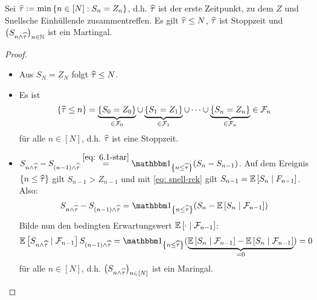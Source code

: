 \begin{lemma} \label{lemma: 5.4}
	Sei $\widehat{\tau} \mathrel{:=} \min\left\{ n \in [N] : S_n = Z_n \right\}$, d.h. $\widehat{\tau}$ ist der erste Zeitpunkt, zu dem $Z$ und Snellsche Einhüllende zusammentreffen. Es gilt $\widehat{\tau} \le N$, $\widehat{\tau}$ ist Stoppzeit und $\left( S_{n \land \widehat{\tau}} \right)_{n \in \mathbb{N}}$ ist ein Martingal.
\end{lemma}
\begin{proof}
	\begin{itemize}[nolistsep, leftmargin=*]
		\item Aus $S_N = Z_N$ folgt $\widehat{\tau} \le N$.
		\item Es ist
		\begin{equation*}
			\left\{ \widehat{\tau} \le n \right\} = \underbrace{\left\{ S_0 = Z_0 \right\}}_{\in \mathcal{F}_0} \cup \underbrace{\left\{ S_1 = Z_1 \right\}}_{\in \mathcal{F}_1} \cup \dots \cup \underbrace{\left\{ S_n = Z_n \right\}}_{\in \mathcal{F}_n} \in \mathcal{F}_n
		\end{equation*}
		für alle $n \in [N]$, d.h. $\widehat{\tau}$ ist eine Stoppzeit.
		\item $S_{n \land \dach{\tau}} - S_{(n-1) \land \dach{\tau}} \overset{\eqref{eq: 6.1-star}}{=} \one_{\menge{n \le \dach{\tau}}} (S_n - S_{n-1})$. Auf dem Ereignis $\left\{ n \le \widehat{\tau} \right\}$ gilt $S_{n-1} > Z_{n-1}$ und mit \eqref{eq: snell-rek} gilt $S_{n-1} = \mathbb{E} \left[ S_n \mid F_{n-1} \right]$. Also:
		\begin{equation*}
			S_{n \land \dach{\tau}} - S_{(n-1) \land \dach{\tau}} = \one_{\menge{n \le \dach{\tau}}} (S_n - \EW[S_n \mid \F_{n-1}])
		\end{equation*}
		Bilde nun den bedingten Erwartungswert $\mathbb{E} \left[ \cdot \mid \mathcal{F}_{n-1} \right]$:
		\begin{equation*}
			\EW[S_{n \land \dach{\tau}} \mid \F_{n-1}]  S_{(n-1) \land \dach{\tau}} = \one_{\menge{n \le \dach{\tau}}} (\underbrace{\EW[S_n \mid \F_{n-1}] - \EW[S_n \mid \F_{n-1}]}_{=0}) = 0
		\end{equation*}
		für alle $n \in [N]$, d.h. $\left( S_{n \land \widehat{\tau}} \right)_{n \in [N]}$ ist ein Maringal.
	\end{itemize}
\end{proof}

